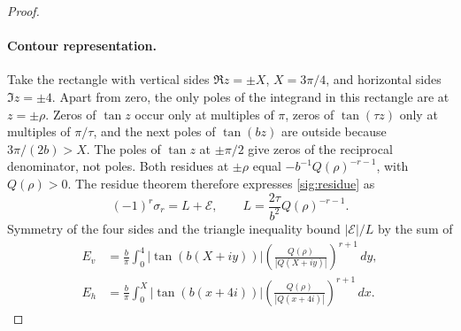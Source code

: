 \begin{proof}
\paragraph{Contour representation.}
Take the rectangle with vertical sides $\Re z=\pm X$,
$X=3\pi/4$, and horizontal sides $\Im z=\pm4$.
Apart from zero, the only poles of the integrand in this rectangle
are at $z=\pm\rho$. Zeros of $\tan z$ occur only at multiples
of $\pi$, zeros of $\tan(\tau z)$ only at multiples of
$\pi/\tau$, and the next poles of $\tan(bz)$ are outside
because $3\pi/(2b)>X$. The poles of $\tan z$ at $\pm\pi/2$
give zeros of the reciprocal denominator, not poles.
Both residues at $\pm\rho$ equal
$-b^{-1}Q(\rho)^{-r-1}$, with $Q(\rho)>0$.
The residue theorem therefore expresses \eqref{sig:residue} as
\begin{equation}\label{sig:main-term}
 (-1)^r\sigma_r=L+\mathcal E,\qquad
 L=\frac{2\tau}{b^2}Q(\rho)^{-r-1}.
\end{equation}
Symmetry of the four sides and the triangle inequality bound
$|\mathcal E|/L$ by the sum of
\begin{align}
 E_v&=\frac b\pi\int_0^4
  |\tan(b(X+iy))|
  \left(\frac{Q(\rho)}{|Q(X+iy)|}\right)^{r+1}\,dy,
  \label{sig:vertical}\\
 E_h&=\frac b\pi\int_0^X
  |\tan(b(x+4i))|
  \left(\frac{Q(\rho)}{|Q(x+4i)|}\right)^{r+1}\,dx.
  \label{sig:horizontal}
\end{align}


\end{proof}
